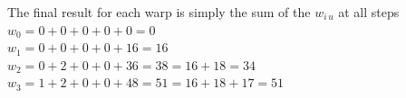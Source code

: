 The final result for each warp is simply the sum of the $w_{i\,u}$ at all steps\\
\(w_0 = 0 + 0 + 0 + 0 + 0 = 0\)\\
\(w_1 = 0 + 0 + 0 + 0 + 16 = 16\)\\
\(w_2 = 0 + 2 + 0 + 0 + 36 = 38 = 16+18=34\)\\
\(w_3 = 1 + 2 + 0 + 0 + 48 = 51 = 16+18+17=51\)\\



